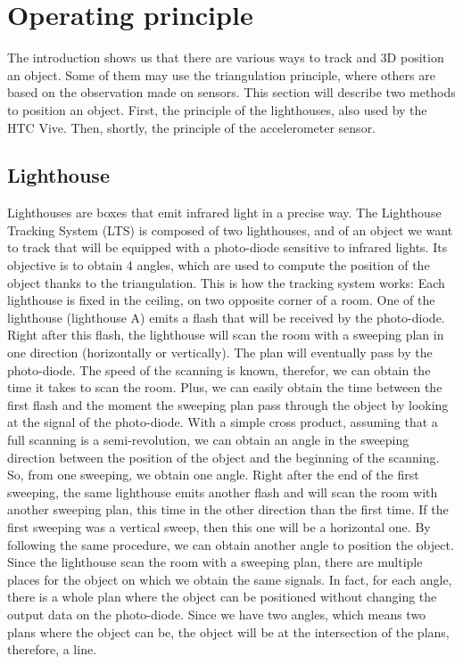 \documentclass{vldb}
\begin{document}
\section{Operating principle} \label{Op}
The introduction shows us that there are various ways to track and 3D position an object. Some of them may use the triangulation principle, where others are based on the observation made on sensors. This section will describe two methods to position an object. First, the principle of the lighthouses, also used by the HTC Vive. Then, shortly, the principle of the accelerometer sensor.
\subsection{Lighthouse} \label{Light}
Lighthouses are boxes that emit infrared light in a precise way. The Lighthouse Tracking System (LTS) is composed of two lighthouses, and of an object we want to track that will be equipped with a photo-diode sensitive to infrared lights. Its objective is to obtain 4 angles, which are used to compute the position of the object thanks to the triangulation. This is how the tracking system works: \newline
Each lighthouse is fixed in the ceiling, on two opposite corner of a room. One of the lighthouse (lighthouse A) emits a flash that will be received by the photo-diode. Right after this flash, the lighthouse will scan the room with a sweeping plan in one direction (horizontally or vertically). The plan will eventually pass by the photo-diode. The speed of the scanning is known, therefor, we can obtain the time it takes to scan the room. Plus, we can easily obtain the time between the first flash and the moment the sweeping plan pass through the object by looking at the signal of the photo-diode. With a simple cross product, assuming that a full scanning is a semi-revolution, we can obtain an angle in the sweeping direction between the position of the object and the beginning of the scanning. So, from one sweeping, we obtain one angle. \newline
Right after the end of the first sweeping, the same lighthouse emits another flash and will scan the room with another sweeping plan, this time in the other direction than the first time. If the first sweeping was a vertical sweep, then this one will be a horizontal one. By following the same procedure, we can obtain another angle to position the object. Since the lighthouse scan the room with a sweeping plan, there are multiple places for the object on which we obtain the same signals. In fact, for each angle, there is a whole plan where the object can be positioned without changing the output data on the photo-diode. Since we have two angles, which means two plans where the object can be, the object will be at the intersection of the plans, therefore, a line.
\end{document}
